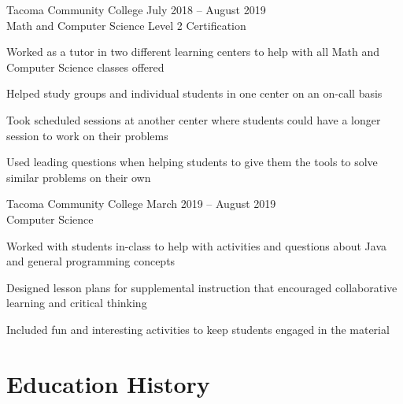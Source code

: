 \documentclass[10pt]{article}
\newenvironment{itemize*}
{\begin{itemize}[leftmargin=*]
    \setlength{\parskip}{0.5pt}}
{\end{itemize}}
\begin{document}
\begin{description}[leftmargin=!,
                    labelwidth=\widthof{\bfseries Internationally Certified Tutor}]

\item[Internationally Certified Tutor] Tacoma Community College \hfill
    July 2018 – August 2019\\
    Math and Computer Science \hfill Level 2 Certification
\end{description}

\begin{itemize*}
\item Worked as a tutor in two different learning centers to help
      with all Math and Computer Science classes offered
\item Helped study groups and individual students in one center on an on-call basis
\item Took scheduled sessions at another center where students could have a
      longer session to work on their problems
\item Used leading questions when helping students to give them the tools to
      solve similar problems on their own
\end{itemize*}
\vspace{10pt}

\begin{description}[leftmargin=!,
                    labelwidth=\widthof{\bfseries Supplementary Instruction Leader}]

\item[Supplementary Instruction Leader] Tacoma Community College \hfill
    March 2019 – August 2019\\
    Computer Science
\end{description}
\begin{itemize*}
\item Worked with students in-class to help with activities and questions about
      Java and general programming concepts
\item Designed lesson plans for supplemental instruction that
      encouraged collaborative learning and critical thinking
\item Included fun and interesting activities to keep students engaged in the material
\end{itemize*}

\section*{Education History}
\end{document}
